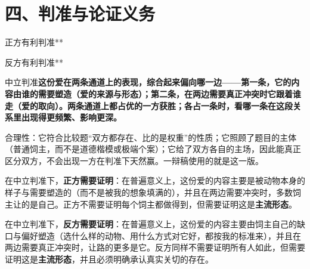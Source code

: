\documentclass[prep,both]{debate}
\begin{document}
\section{四、判准与论证义务}
\begin{fields}
\begin{procard}{正方有利判准}**\end{procard}
\begin{concard}{反方有利判准}**\end{concard}
\begin{neutralcard}{中立判准}\textbf{这份爱在两条通道上的表现，综合起来偏向哪一边——第一条，它的内容由谁的需要塑造（爱的来源与形态）；第二条，在两边需要真正冲突时它跟着谁走（爱的取向）。两条通道上都占优的一方获胜；各占一条时，看哪一条在这段关系里出现得更频繁、影响更深。}\end{neutralcard}
\begin{bullets}
\item 合理性：它符合比较题“双方都存在、比的是权重”的性质；它照顾了题目的主体（普通饲主，而不是道德楷模或极端个案）；它给了双方各自的主场，因此能真正区分双方，不会出现一方在判准下天然赢。一辩稿使用的就是这一版。
\item 在中立判准下，\textbf{正方需要证明}：在普遍意义上，这份爱的内容主要是被动物本身的样子与需要塑造的（而不是被我的想象填满的），并且在两边需要冲突时，多数饲主让的是自己。正方不需要证明每个饲主都做得到，但需要证明这是\textbf{主流形态}。
\item 在中立判准下，\textbf{反方需要证明}：在普遍意义上，这份爱的内容主要由饲主自己的缺口与偏好塑造（选什么样的动物、用什么方式对它好，都按我的标准来），并且在两边需要真正冲突时，让路的更多是它。反方同样不需要证明所有人如此，但需要证明这是\textbf{主流形态}，并且必须明确承认真实关切的存在。

\end{bullets}
\end{fields}
\end{document}

